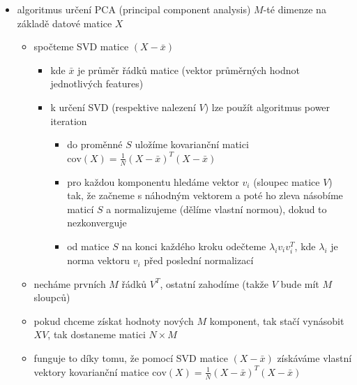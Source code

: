 \begin{itemize}
\begin{itemize}
\begin{itemize}
\begin{itemize}
\item tedy matici $\Sigma$ můžeme redukovat na rozměry $r\times r$, podobně $U$ můžeme redukovat na $m\times r$ a $V^T$ na $r\times n$, touto kompresí nepřijdeme o žádné informace
\end{itemize}
\item dokonce můžeme $\Sigma$ zmenšit ještě víc
\begin{itemize}
\item zvolíme $k\lt r$
\item necháme jenom $k$ největších singulárních čísel, všechny ostatní zahodíme
\item tím už se nějaké informace ztratí
\item budeme mít aproximaci původní matice $X$, ta aproximace bude mít hodnost $k$
\end{itemize}
\end{itemize}
\item algoritmus určení PCA (principal component analysis) $M$-té dimenze na základě datové matice $X$
\begin{itemize}
\item spočteme SVD matice $(X-\bar x)$
\begin{itemize}
\item kde $\bar x$ je průměr řádků matice (vektor průměrných hodnot jednotlivých features)
\item k určení SVD (respektive nalezení $V$) lze použít algoritmus power iteration
\begin{itemize}
\item do proměnné $S$ uložíme kovarianční matici $\text{cov}(X)=\frac 1N(X-\bar x)^T(X-\bar x)$
\item pro každou komponentu hledáme vektor $v_i$ (sloupec matice $V$) tak, že začneme s náhodným vektorem a poté ho zleva násobíme maticí $S$ a normalizujeme (dělíme vlastní normou), dokud to nezkonverguje
\item od matice $S$ na konci každého kroku odečteme $\lambda_iv_iv_i^T$, kde $\lambda_i$ je norma vektoru $v_i$ před poslední normalizací
\end{itemize}
\end{itemize}
\item necháme prvních $M$ řádků $V^T$, ostatní zahodíme (takže $V$ bude mít $M$ sloupců)
\item pokud chceme získat hodnoty nových $M$ komponent, tak stačí vynásobit $XV$, tak dostaneme matici $N\times M$
\item funguje to díky tomu, že pomocí SVD matice $(X-\bar x)$ získáváme vlastní vektory kovarianční matice $\text{cov}(X)=\frac 1N(X-\bar x)^T(X-\bar x)$

\end{itemize}
\end{itemize}
\end{itemize}
